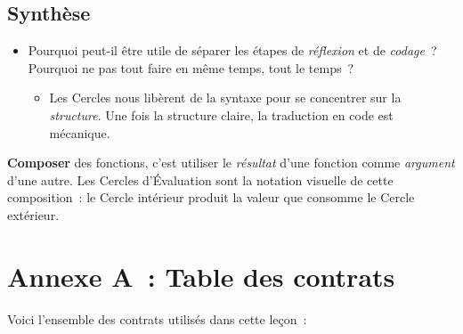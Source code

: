 \documentclass[12pt,a4paper]{article}
\begin{document}
\subsection{Synthèse}

\begin{thinkbox}
  \begin{itemize}
    \item Pourquoi peut-il être utile de séparer les étapes de \emph{réflexion} et de \emph{codage}~? Pourquoi ne pas tout faire en même temps, tout le temps~?
    \begin{itemize}
      \item Les Cercles nous libèrent de la syntaxe pour se concentrer sur la \emph{structure}. Une fois la structure claire, la traduction en code est mécanique.
    \end{itemize}
  \end{itemize}
\end{thinkbox}

\begin{keypointbox}
  \textbf{Composer} des fonctions, c'est utiliser le \emph{résultat} d'une fonction comme \emph{argument} d'une autre. Les Cercles d'Évaluation sont la notation visuelle de cette composition~: le Cercle intérieur produit la valeur que consomme le Cercle extérieur.
\end{keypointbox}

\newpage

\section*{Annexe A~: Table des contrats}

Voici l'ensemble des contrats utilisés dans cette leçon~:
\end{document}
